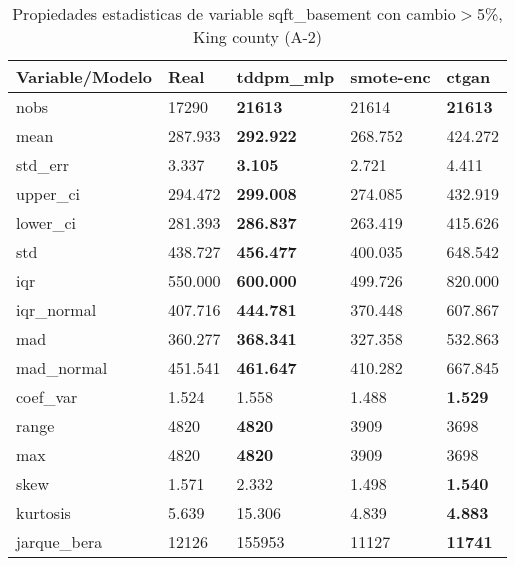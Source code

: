 \begin{table}[H]
\centering
\fontsize{8}{14}\selectfont
\caption{Propiedades estadisticas de variable sqft\_basement con cambio\ensuremath{>}5\%, King county (A-2)}
\label{table-stats-king county-a-2-sqft_basement-short}
\begin{tabular}{|l|m{10em}|m{10em}|m{10em}|m{10em}|}
\hline
 \rowcolor[gray]{0.8}
Variable/Modelo & Real & tddpm\_mlp & smote-enc & ctgan \\
\hline nobs & 17290 & \bfseries 21613 & \cellcolor[rgb]{0.9, 0.54, 0.52} 21614 & \bfseries 21613 \\
\hline mean & 287.933 & \bfseries 292.922 & 268.752 & \cellcolor[rgb]{0.9, 0.54, 0.52} 424.272 \\
\hline std\_err & 3.337 & \bfseries 3.105 & 2.721 & \cellcolor[rgb]{0.9, 0.54, 0.52} 4.411 \\
\hline upper\_ci & 294.472 & \bfseries 299.008 & 274.085 & \cellcolor[rgb]{0.9, 0.54, 0.52} 432.919 \\
\hline lower\_ci & 281.393 & \bfseries 286.837 & 263.419 & \cellcolor[rgb]{0.9, 0.54, 0.52} 415.626 \\
\hline std & 438.727 & \bfseries 456.477 & 400.035 & \cellcolor[rgb]{0.9, 0.54, 0.52} 648.542 \\
\hline iqr & 550.000 & \bfseries 600.000 & 499.726 & \cellcolor[rgb]{0.9, 0.54, 0.52} 820.000 \\
\hline iqr\_normal & 407.716 & \bfseries 444.781 & 370.448 & \cellcolor[rgb]{0.9, 0.54, 0.52} 607.867 \\
\hline mad & 360.277 & \bfseries 368.341 & 327.358 & \cellcolor[rgb]{0.9, 0.54, 0.52} 532.863 \\
\hline mad\_normal & 451.541 & \bfseries 461.647 & 410.282 & \cellcolor[rgb]{0.9, 0.54, 0.52} 667.845 \\
\hline coef\_var & 1.524 & 1.558 & \cellcolor[rgb]{0.9, 0.54, 0.52} 1.488 & \bfseries 1.529 \\
\hline range & 4820 & \bfseries 4820 & 3909 & \cellcolor[rgb]{0.9, 0.54, 0.52} 3698 \\
\hline max & 4820 & \bfseries 4820 & 3909 & \cellcolor[rgb]{0.9, 0.54, 0.52} 3698 \\
\hline skew & 1.571 & \cellcolor[rgb]{0.9, 0.54, 0.52} 2.332 & 1.498 & \bfseries 1.540 \\
\hline kurtosis & 5.639 & \cellcolor[rgb]{0.9, 0.54, 0.52} 15.306 & 4.839 & \bfseries 4.883 \\
\hline jarque\_bera & 12126 & \cellcolor[rgb]{0.9, 0.54, 0.52} 155953 & 11127 & \bfseries 11741 \\

\end{tabular}
\end{table}
